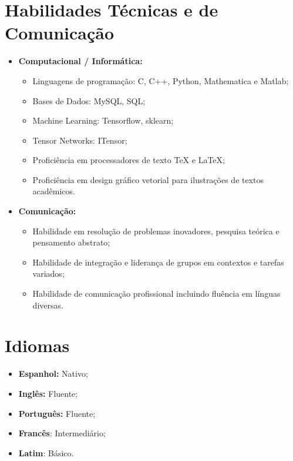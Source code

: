 \documentclass[11pt,a4paper,sans]{moderncv}        %
\begin{document}
\section{Habilidades Técnicas e de Comunicação}

\vspace{4pt}

\begin{itemize}

\item \textbf{Computacional / Informática:} 
\begin{itemize}
\item Linguagens de programação: C, C++, Python, Mathematica e Matlab;
\item Bases de Dados: MySQL, SQL;
\item Machine Learning: Tensorflow, sklearn; 
\item Tensor Networks: ITensor;
\item Proficiência em processadores de texto TeX e LaTeX;
\item Proficiência em design gráfico vetorial para ilustrações de textos acadêmicos. 
\end{itemize}

\item \textbf{Comunicação:} 

\begin{itemize}
\item Habilidade em resolução de problemas inovadores, pesquisa teórica e pensamento abstrato;
\vspace{1pt}
\item Habilidade de integração e liderança de grupos em contextos e tarefas variados; 
\vspace{1pt}
\item Habilidade de comunicação profissional incluindo fluência em línguas diversas.

\end{itemize}

\end{itemize}

\section{Idiomas}
\vspace{4pt}
\begin{itemize}
\item{\textbf{Espanhol:}} Nativo;
\item{\textbf{Inglês:}} Fluente;
\item{\textbf{Português:}} Fluente;
\item{\textbf{Francês}:} Intermediário;
\item{\textbf{Latim}:} Básico.
\end{itemize}
\end{document}
